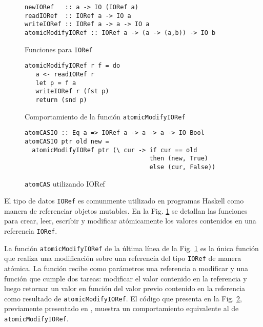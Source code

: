\begin{figure}[t]
\centering
\begin{verbatim}
newIORef   :: a -> IO (IORef a)
readIORef  :: IORef a -> IO a
writeIORef :: IORef a -> a -> IO a
atomicModifyIORef :: IORef a -> (a -> (a,b)) -> IO b
\end{verbatim}
\caption{Funciones para \texttt{IORef}}
\label{fig:ioref-interface}
\end{figure}

\begin{figure}[t]
\centering
\begin{verbatim}
atomicModifyIORef r f = do
   a <- readIORef r
   let p = f a
   writeIORef r (fst p)
   return (snd p)
\end{verbatim}
\caption{Comportamiento de la función \texttt{atomicModifyIORef}}
\label{fig:atomicModifyIORef-behavior}
\end{figure}

\begin{figure}[t]
\begin{verbatim}
atomCASIO :: Eq a => IORef a -> a -> a -> IO Bool
atomCASIO ptr old new =
  atomicModifyIORef ptr (\ cur -> if cur == old
                                  then (new, True)
                                  else (cur, False))
\end{verbatim}
\caption{\texttt{atomCAS} utilizando IORef}
\label{fig:atomcasio}
\end{figure}

El tipo de datos \texttt{IORef} es comunmente utilizado en programas Haskell como manera de referenciar objetos mutables.
En la Fig. \ref{fig:ioref-interface} se detallan las funciones para crear, leer, escribir y modificar atómicamente los valores contenidos en una referencia \texttt{IORef}.

La función \texttt{atomicModifyIORef} de la última línea de la Fig. \ref{fig:ioref-interface} es la única función que realiza una modificación sobre una referencia del tipo \texttt{IORef} de manera atómica.
La función recibe como parámetros una referencia a modificar y una función que cumple dos tareas: modificar el valor contenido en la referencia y luego retornar un valor en función del valor previo contenido en la referencia como resultado de \texttt{atomicModifyIORef}. El código que presenta en la Fig. \ref{fig:atomicModifyIORef-behavior}, previamente presentado en \cite{linked-list}, muestra un comportamiento equivalente al de \texttt{atomicModifyIORef}.

